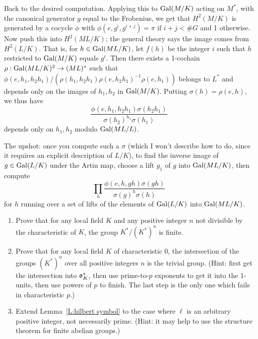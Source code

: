 Back to the desired computation. Applying this to $\operatorname{Gal}(M/K)$ acting on
$M^*$, with the canonical generator $g$ equal to the Frobenius,
we get that $H^2(M/K)$ is generated by a cocycle $\phi$ with
$\phi(e, g^i, g^{i+j}) = \pi$ if $i+j < \#G$ and 1 otherwise. Now push
this into $H^2(ML/K)$; the general theory says the image comes from 
$H^2(L/K)$. That is, for $h \in \operatorname{Gal}(ML/K)$, let $f(h)$ be the integer $i$
such that $h$ restricted to $\operatorname{Gal}(M/K)$ equals $g^i$. Then
there exists a 1-cochain $\rho: \operatorname{Gal}(ML/K)^2 \to (ML)^*$ such that
$\phi(e, h_1, h_2h_1) /(\rho(h_1, h_2h_1) \rho(e, h_2h_1)^{-1} \rho(e, h_1))$
belongs to $L^*$ and depends only on the images of $h_1, h_2$ in $\operatorname{Gal}(M/K)$.
Putting $\sigma(h) = \rho(e, h)$, we thus have
\[
\frac{\phi(e, h_1, h_2h_1) \sigma(h_2h_1)}{\sigma(h_2)^{h_1} \sigma(h_1)}
\]
depends only on $h_1, h_2$ modulo $\operatorname{Gal}(ML/L)$.

The upshot: once you compute such a $\sigma$ (which I won't describe how to
do, since it requires an explicit description of $L/K$), to
find the inverse image of $g \in \operatorname{Gal}(L/K)$ under the Artin map, 
choose a lift $g_1$ of $g$ into $\operatorname{Gal}(ML/K)$, then compute
\[
\prod_h \frac{\phi(e, h, gh) \sigma(gh)}{\sigma(g)^h \sigma(h)}
\]
for $h$ running over a set of lifts of the elements of $\operatorname{Gal}(L/K)$ into
$\operatorname{Gal}(ML/K)$.


\begin{enumerate}
\item
Prove that for any local field $K$ and any positive integer $n$ not divisible by the characteristic of $K$, the group
$K^*/(K^*)^{n}$ is finite.
\item
Prove that for any local field $K$ of characteristic $0$, the intersection of the groups
$(K^*)^n$ over all positive integers $n$ is the trivial group. (Hint: first get the intersection into $\mathfrak{o}_K^*$, then use prime-to-$p$ exponents to get it into the 1-units, then use powers of $p$ to finish. The last step is the only one which fails in characteristic $p$.)
\item
Extend Lemma~\ref{L:hilbert symbol} to the case where $\ell$ is an arbitrary positive integer, not necessarily prime. (Hint: it may help to use the structure theorem for finite abelian groups.)
\end{enumerate}

%
